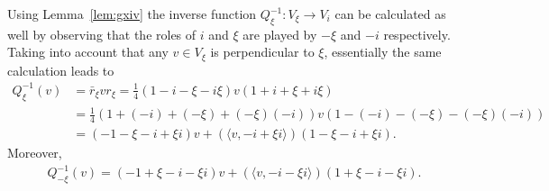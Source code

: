 \documentclass[10pt,a4paper]{amsart}
\numberwithin{equation}{section}
\begin{document}
Using Lemma~\ref{lem:gxiv} the inverse function $Q_{\xi}^{-1}\colon V_\xi \rightarrow V_i$ can be calculated as well by observing that the roles of $i$ and $\xi$ are played by $-\xi$ and $-i$ respectively. Taking into account that any $v\in V_\xi$ is perpendicular to $\xi$, essentially the same calculation leads to
\begin{align*}
Q_\xi^{-1}(v) &=\bar{r}_\xi v r_\xi=\frac{1}{4}(1-i-\xi-i\xi)v(1+i+\xi+i\xi)\\
&=\frac{1}{4}(1+(-i)+(-\xi)+(-\xi)(-i))v(1-(-i)-(-\xi)-(-\xi)(-i))\\
&=(-1-\xi-i+\xi i) v + (\langle v, -i + \xi i \rangle )(1-\xi-i+\xi i).
\end{align*}
Moreover,
\begin{gather*}
Q_{-\xi}^{-1}(v)=(-1+\xi-i-\xi i) v + (\langle v, -i - \xi i \rangle )(1+\xi-i-\xi i).
\end{gather*}
\end{document}
